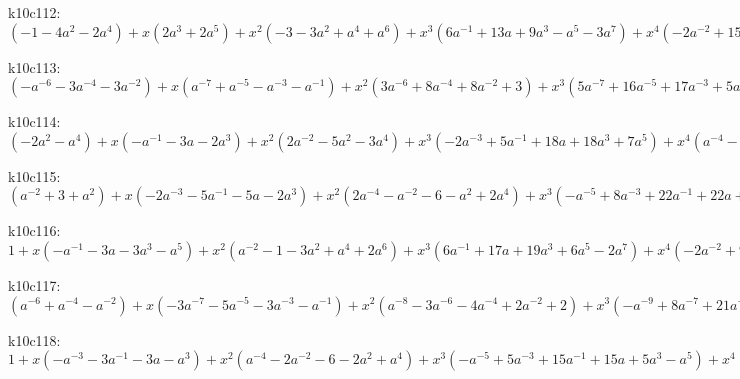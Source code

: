 k10c112: $ (-1-4a^{2}-2a^{4}) +x(2a^{3}+2a^{5}) +x^{2}(-3-3a^{2}+a^{4}+a^{6}) +x^{3}(6a^{-1}+13a+9a^{3}-a^{5}-3a^{7}) +x^{4}(-2a^{-2}+15+28a^{2}+3a^{4}-7a^{6}+a^{8}) +x^{5}(-11a^{-1}-16a-17a^{3}-8a^{5}+4a^{7}) +x^{6}(a^{-2}-18-35a^{2}-9a^{4}+7a^{6}) +x^{7}(4a^{-1}+4a^{3}+8a^{5}) +x^{8}(6+13a^{2}+7a^{4}) +x^{9}(3a+3a^{3}) $

k10c113: $ (-a^{-6}-3a^{-4}-3a^{-2}) +x(a^{-7}+a^{-5}-a^{-3}-a^{-1}) +x^{2}(3a^{-6}+8a^{-4}+8a^{-2}+3) +x^{3}(5a^{-7}+16a^{-5}+17a^{-3}+5a^{-1}-a) +x^{4}(-5a^{-8}-4a^{-6}+a^{-4}-6a^{-2}-6) +x^{5}(a^{-9}-16a^{-7}-36a^{-5}-30a^{-3}-10a^{-1}+a) +x^{6}(5a^{-8}-9a^{-6}-23a^{-4}-5a^{-2}+4) +x^{7}(10a^{-7}+15a^{-5}+12a^{-3}+7a^{-1}) +x^{8}(9a^{-6}+16a^{-4}+7a^{-2}) +x^{9}(3a^{-5}+3a^{-3}) $

k10c114: $ (-2a^{2}-a^{4}) +x(-a^{-1}-3a-2a^{3}) +x^{2}(2a^{-2}-5a^{2}-3a^{4}) +x^{3}(-2a^{-3}+5a^{-1}+18a+18a^{3}+7a^{5}) +x^{4}(a^{-4}-8a^{-2}+1+26a^{2}+14a^{4}-2a^{6}) +x^{5}(4a^{-3}-13a^{-1}-27a-21a^{3}-11a^{5}) +x^{6}(8a^{-2}-9-35a^{2}-17a^{4}+a^{6}) +x^{7}(10a^{-1}+8a+2a^{3}+4a^{5}) +x^{8}(8+14a^{2}+6a^{4}) +x^{9}(3a+3a^{3}) $

k10c115: $ (a^{-2}+3+a^{2}) +x(-2a^{-3}-5a^{-1}-5a-2a^{3}) +x^{2}(2a^{-4}-a^{-2}-6-a^{2}+2a^{4}) +x^{3}(-a^{-5}+8a^{-3}+22a^{-1}+22a+8a^{3}-a^{5}) +x^{4}(-5a^{-4}+a^{-2}+12+a^{2}-5a^{4}) +x^{5}(a^{-5}-13a^{-3}-34a^{-1}-34a-13a^{3}+a^{5}) +x^{6}(4a^{-4}-9a^{-2}-26-9a^{2}+4a^{4}) +x^{7}(8a^{-3}+13a^{-1}+13a+8a^{3}) +x^{8}(8a^{-2}+16+8a^{2}) +x^{9}(3a^{-1}+3a) $

k10c116: $ 1 +x(-a^{-1}-3a-3a^{3}-a^{5}) +x^{2}(a^{-2}-1-3a^{2}+a^{4}+2a^{6}) +x^{3}(6a^{-1}+17a+19a^{3}+6a^{5}-2a^{7}) +x^{4}(-2a^{-2}+9+19a^{2}-a^{4}-8a^{6}+a^{8}) +x^{5}(-10a^{-1}-22a-29a^{3}-13a^{5}+4a^{7}) +x^{6}(a^{-2}-15-32a^{2}-8a^{4}+8a^{6}) +x^{7}(4a^{-1}+3a+9a^{3}+10a^{5}) +x^{8}(6+14a^{2}+8a^{4}) +x^{9}(3a+3a^{3}) $

k10c117: $ (a^{-6}+a^{-4}-a^{-2}) +x(-3a^{-7}-5a^{-5}-3a^{-3}-a^{-1}) +x^{2}(a^{-8}-3a^{-6}-4a^{-4}+2a^{-2}+2) +x^{3}(-a^{-9}+8a^{-7}+21a^{-5}+18a^{-3}+5a^{-1}-a) +x^{4}(-5a^{-8}+6a^{-6}+17a^{-4}-6) +x^{5}(a^{-9}-14a^{-7}-29a^{-5}-26a^{-3}-11a^{-1}+a) +x^{6}(4a^{-8}-12a^{-6}-28a^{-4}-8a^{-2}+4) +x^{7}(8a^{-7}+10a^{-5}+9a^{-3}+7a^{-1}) +x^{8}(8a^{-6}+15a^{-4}+7a^{-2}) +x^{9}(3a^{-5}+3a^{-3}) $

k10c118: $ 1 +x(-a^{-3}-3a^{-1}-3a-a^{3}) +x^{2}(a^{-4}-2a^{-2}-6-2a^{2}+a^{4}) +x^{3}(-a^{-5}+5a^{-3}+15a^{-1}+15a+5a^{3}-a^{5}) +x^{4}(-6a^{-4}+6a^{-2}+24+6a^{2}-6a^{4}) +x^{5}(a^{-5}-12a^{-3}-20a^{-1}-20a-12a^{3}+a^{5}) +x^{6}(4a^{-4}-11a^{-2}-30-11a^{2}+4a^{4}) +x^{7}(7a^{-3}+6a^{-1}+6a+7a^{3}) +x^{8}(7a^{-2}+14+7a^{2}) +x^{9}(3a^{-1}+3a) $

